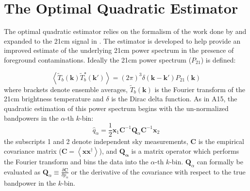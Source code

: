 \documentclass[preprint2,hidelinks]{emulateapj}
\begin{document}
\section{The Optimal Quadratic Estimator}\label{sec:oqe}{

The optimal quadratic estimator relies on the formalism of the work done by \citet{tegmark1997} and expanded to the 21cm signal in \citet{liu_tegmark2011}. The estimator is developed to help provide an improved estimate of the underlying 21cm power spectrum in the presence of foreground contaminations. Ideally the 21cm power spectrum ($P_{21}$) is defined:

\begin{equation}
\left\langle \tilde{T}_{b}(\mathbf{k}) \tilde{T}_{b}^{\star}(\mathbf{k'}) \right\rangle = \left( 2\pi \right)^{3} \delta(\mathbf{k} - \mathbf{k'}) P_{21}(\mathbf{k})
\end{equation}
where brackets denote ensemble averages, $\tilde{T}_{b}(\mathbf{k})$ is the Fourier transform of the 21cm brightness temperature and $\delta$ is the Dirac delta function. As in A15, the quadratic estimation of this power spectrum begins with the un-normalized bandpowers in the $\alpha$-th $k$-bin:
\begin{equation}
\hat{q}_{\alpha} = \frac{1}{2}\mathbf{x}_{1}\mathbf{C}^{-1}\mathbf{Q}_{\alpha}\mathbf{C}^{-1}\mathbf{x}_{2} \label{eqn:q_hats}
\end{equation}
 the subscripts 1 and 2 denote independent sky measurements, $\mathbf{C}$ is the empirical covariance matrix ($\mathbf{C} = \left\langle \mathbf{x} \mathbf{x}^{\dagger} \right\rangle $), and $\mathbf{Q_{\alpha}}$ is a matrix operator which performs the Fourier transform and bins the data into the $\alpha$-th $k$-bin. $\mathbf{Q}_{\alpha}$ can formally be evaluated as $\mathbf{Q}_{\alpha} \equiv \frac{\delta \mathbf{C}}{\delta p_{\alpha}}$ or the derivative of the covariance with respect to the true bandpower in the $k$-bin.
 
}
\end{document}
